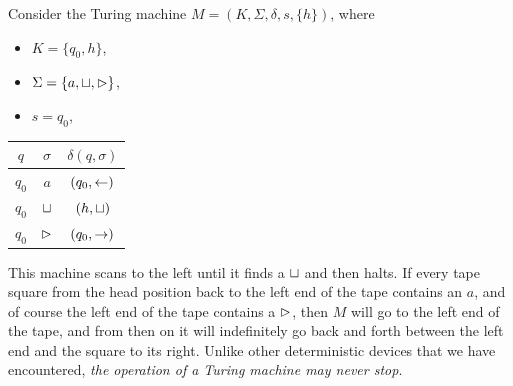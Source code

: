 \begin{example}{}
Consider the Turing machine $M = (K, \Sigma, \delta, s, \{h\})$, where
\begin{itemize}
  \item $K = \{ q_0, h \}$,
  \item $\Sigma = \{ a, \sqcup, \vartriangleright \}$, 
  \item $s = q_0$,
\end{itemize}
\begin{table}[H]
  \centering
  \begin{tabular}{|cc|c|} 
  \hline
  $q$ & $\sigma$ & $\delta(q, \sigma)$  \\ 
  \hline
  $q_0$  &  $a$       &  $(q_0, \leftarrow)$ \\
  $q_0$  &  $\sqcup$  &  $(h, \sqcup)$   \\
  $q_0$  &  $\vartriangleright$    &  $(q_0, \rightarrow)$    \\
  \hline
  \end{tabular}
\end{table}
This machine scans to the left until it finds a $\sqcup$ and then halts. If every tape square from the head position back to the left end of the tape contains an $a$, and of course the left end of the tape contains a $\vartriangleright$, then $M$ will go to the left end of the tape, and from then on it will indefinitely go back and forth between the left end and the square to its right. Unlike other deterministic devices that we have encountered, \textit{the operation of a Turing machine may never stop}.

\end{example}

